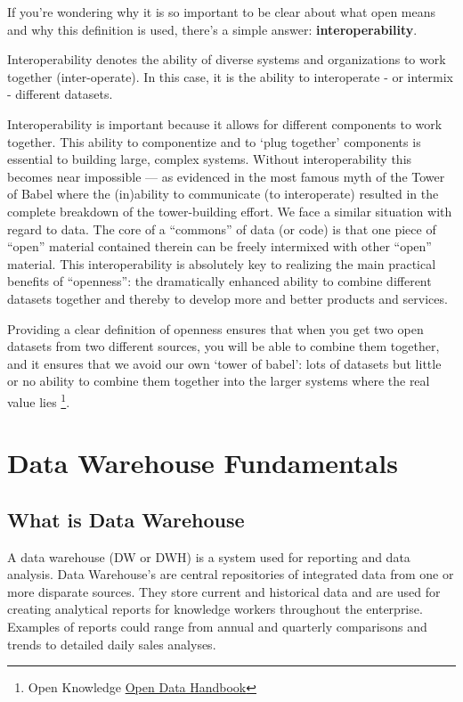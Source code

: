 \documentclass[letterpaper,12pt,oneside]{sphinxmanual}
\begin{document}
If you’re wondering why it is so important to be clear about what open means and why this definition is used, there’s a simple answer: \textbf{interoperability}.

Interoperability denotes the ability of diverse systems and organizations to work together (inter-operate). In this case, it is the ability to interoperate - or intermix - different datasets.

Interoperability is important because it allows for different components to work together. This ability to componentize and to ‘plug together’ components is essential to building large, complex systems. Without interoperability this becomes near impossible — as evidenced in the most famous myth of the Tower of Babel where the (in)ability to communicate (to interoperate) resulted in the complete breakdown of the tower-building effort.
We face a similar situation with regard to data. The core of a “commons” of data (or code) is that one piece of “open” material contained therein can be freely intermixed with other “open” material. This interoperability is absolutely key to realizing the main practical benefits of “openness”: the dramatically enhanced ability to combine different datasets together and thereby to develop more and better products and services.

Providing a clear definition of openness ensures that when you get two open datasets from two different sources, you will be able to combine them together, and it ensures that
we avoid our own ‘tower of babel’: lots of datasets but little or no ability to combine them together into the larger systems where the real value lies \footnote[4]{\sphinxAtStartFootnote%
Open Knowledge \href{http://opendatahandbook.org/guide/en/what-is-open-data/}{Open Data Handbook}
}.


\section{Data Warehouse Fundamentals}
\label{introduction:data-warehouse-fundamentals}

\subsection{What is Data Warehouse}
\label{introduction:what-is-data-warehouse}
A data warehouse (DW or DWH) is a system used for reporting and data analysis.
Data Warehouse's are central repositories of integrated data from one or more disparate sources.
They store current and historical data and are used for creating analytical reports for knowledge workers throughout the enterprise. Examples of reports could range from annual and quarterly comparisons and trends to detailed daily sales analyses.
\end{document}

